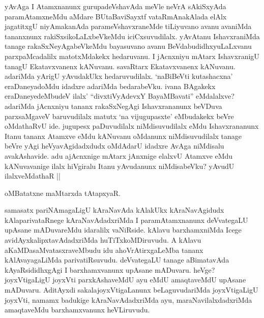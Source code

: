 \begin{artha}
  yAvAga I Atamxnanunx gurupadeVshavAda meVle neVrA sAkiSxyAda paramAtamxneMdu aMdare BUtaBaviSayxtf vataRmAnakAlada elAlx jagatitxgU niyAmakanAda parameVshavxraneMde tiLiyuvano avanu avaniMda tananxnunx rakiSxsikoLaLxbeVkeMdu iciCxsuvudilalx. yAvAtanu IshavxraniMda tanage rakaSxNeyAgabeVkeMdu bayasuvano avanu BeVdabudidhxyuLaLxvanu parxpaMcadalilx matotxMdakekx hedaruvanu. I jAcnxniyu mAtarx IshavxranigU tanagU Ekatavxvanenx kANuvanu. savaRtarx Ekatavxvanenx kANuvanu. adariMda yArigU yAvudakUkx hedaruvudilalx. `naBiBeVti kutashacxna' eraDaneyadoMdu idadxre adariMda bedarabeVku. ivana BAgakekx eraDaneyedeMbudeV ilalx' ``divxtiVyAdevxY BayaMBavati'' eMdalalxve? adariMda jAcnxniyu tananx rakaSxNegAgi Ishavxrananunx beVDuva parxsaMgaveV baruvudilalx matutx `na vijugupasxte' eMbudakekx beVre oMdathaRvU ide. jugupesx paDuvudilalx niMdisuvudilalx eMdu Ishavxrananunx Itanu tananx Atamxve eMdu kANuvanu oMdanunx niMdisuvudilalx tanage beVre yAgi heVyavAgidadxdudx oMdAdarU idadxre AvAga niMdisalu avakAshavide. adu ajAcnxnige mAtarx jAnxnige elalxvU Atamxve eMdu kANuvavanige ilalx hiVgiralu Itanu yAvudanunx niMdisabeVku? yAvudU ilalxveMdathaR ||
\end{artha}

\begin{artha}
  oMBatatxne maMtarxda tAtapxyaR.

  samasatx pariNAmagaLigU kAraNavAda kAlakUkx kAraNavAgidudx kAlaparivataRnege kAraNavAdadxriMda I paramAtamxnanunx deVvategaLU upAsane mADuvareMdu idaralilx vaNiRside. kAlavu barxhamxniMda Icege avidAyxkalipxtavAdadxriMda huTiTxkoMDiruvudu. A kAlavu aKaMDasaMvatasxraveMbudu idu ahoVrAtirxgaLeMba tananx kAlAvayagaLiMda parivatiRsuvudu. deVvategaLU tanage aBimatavAda kAyaRsididhxgAgi I barxhamxvanunx upAsane mADuvaru. heVge? joyxVtigaLigU joyxVti parxkAshaveMdU ayu eMdU amaqtaveMdU upAsane mADuvaru. AditAyxdi sakalajoyxVtigaLanunx beLaguvudariMda joyxVtigaLigU joyxVti, namamx badukige kAraNavAdadxriMda ayu, maraNavilalxdadxriMda amaqtaveMdu barxhamxvanunx heVLiruvudu.
\end{artha}



